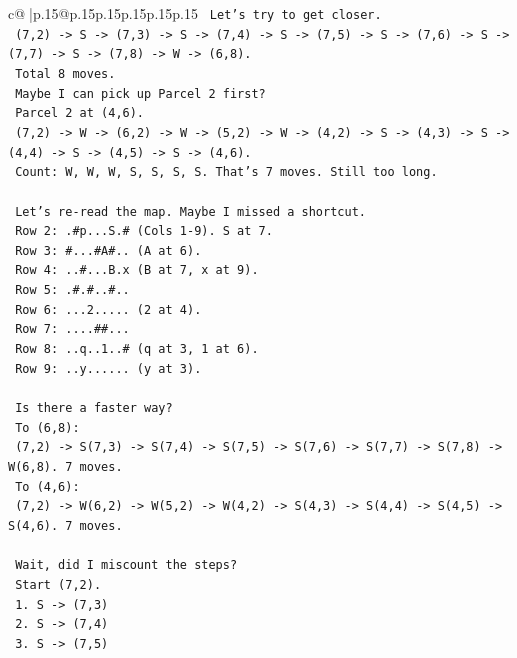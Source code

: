 \documentclass{article}
\begin{document}
{\begin{supertabular}{c@{$\;$}|p{.15\linewidth}@{}p{.15\linewidth}p{.15\linewidth}p{.15\linewidth}p{.15\linewidth}p{.15\linewidth}}
{{{\texttt{    Let's try to get closer.} \\
\texttt{    (7,2) {-}> S {-}> (7,3) {-}> S {-}> (7,4) {-}> S {-}> (7,5) {-}> S {-}> (7,6) {-}> S {-}> (7,7) {-}> S {-}> (7,8) {-}> W {-}> (6,8).} \\
\texttt{    Total 8 moves.} \\
\texttt{    Maybe I can pick up Parcel 2 first?} \\
\texttt{    Parcel 2 at (4,6).} \\
\texttt{    (7,2) {-}> W {-}> (6,2) {-}> W {-}> (5,2) {-}> W {-}> (4,2) {-}> S {-}> (4,3) {-}> S {-}> (4,4) {-}> S {-}> (4,5) {-}> S {-}> (4,6).} \\
\texttt{    Count: W, W, W, S, S, S, S. That's 7 moves. Still too long.} \\
\\ 
\texttt{    Let's re{-}read the map. Maybe I missed a shortcut.} \\
\texttt{    Row 2: .\#p...S.\# (Cols 1{-}9). S at 7.} \\
\texttt{    Row 3: \#...\#A\#.. (A at 6).} \\
\texttt{    Row 4: ..\#...B.x (B at 7, x at 9).} \\
\texttt{    Row 5: .\#.\#..\#..} \\
\texttt{    Row 6: ...2..... (2 at 4).} \\
\texttt{    Row 7: ....\#\#...} \\
\texttt{    Row 8: ..q..1..\# (q at 3, 1 at 6).} \\
\texttt{    Row 9: ..y...... (y at 3).} \\
\\ 
\texttt{    Is there a faster way?} \\
\texttt{    To (6,8):} \\
\texttt{    (7,2) {-}> S(7,3) {-}> S(7,4) {-}> S(7,5) {-}> S(7,6) {-}> S(7,7) {-}> S(7,8) {-}> W(6,8). 7 moves.} \\
\texttt{    To (4,6):} \\
\texttt{    (7,2) {-}> W(6,2) {-}> W(5,2) {-}> W(4,2) {-}> S(4,3) {-}> S(4,4) {-}> S(4,5) {-}> S(4,6). 7 moves.} \\
\\ 
\texttt{    Wait, did I miscount the steps?} \\
\texttt{    Start (7,2).} \\
\texttt{    1. S {-}> (7,3)} \\
\texttt{    2. S {-}> (7,4)} \\
\texttt{    3. S {-}> (7,5)} \\
}}}
\end{supertabular}}
\end{document}
